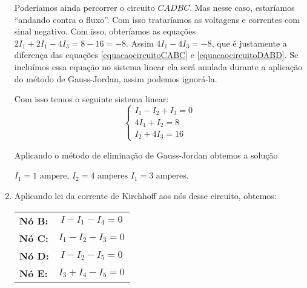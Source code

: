 \begin{exemplos}
\begin{solucao}
\begin{enumerate}
            Poderíamos ainda percorrer o circuito $CADBC$. Mas nesse caso, estaríamos ``andando contra o fluxo''. Com isso trataríamos as voltagens e correntes com sinal negativo. Com isso, obteríamos as equações $2I_1 + 2I_1 - 4I_3 = 8 - 16 = -8$. Assim $4I_1 - 4I_3 = -8$, que é justamente a diferença das equações \eqref{equacaocircuitoCABC} e \eqref{equacaocircuitoDABD}. Se incluímos essa equação no sistema linear ela será anulada durante a aplicação do método de Gauss-Jordan, assim podemos ignorá-la.

            Com isso temos o seguinte sistema linear:
            \[
                \begin{cases}
                    I_1 - I_2 + I_3 = 0\\
                    4I_1 + I_2 = 8\\
                    I_2 + 4I_3 = 16
                \end{cases}
            \]

            Aplicando o método de eliminação de Gauss-Jordan obtemos a solução
            \begin{center}
                $I_1 = 1 \mbox{ ampere}$, $I_2 = 4 \mbox{ amperes}$ $I_1 = 3 \mbox{ amperes}$.
            \end{center}

            \item Aplicando lei da corrente de Kirchhoff aos nós desse circuito, obtemos:
            \begin{center}
                \begin{tabular}{lc}
                    \textbf{Nó B:} & $I - I_1 - I_4 = 0$\\
                    \textbf{Nó C:} & $I_1 - I_2 - I_3 = 0$\\
                    \textbf{Nó D:} & $I - I_2 - I_5 = 0$\\
                    \textbf{Nó E:}& $I_3 + I_4 - I_5 = 0$
                \end{tabular}
            \end{center}


\end{enumerate}
\end{solucao}
\end{exemplos}
